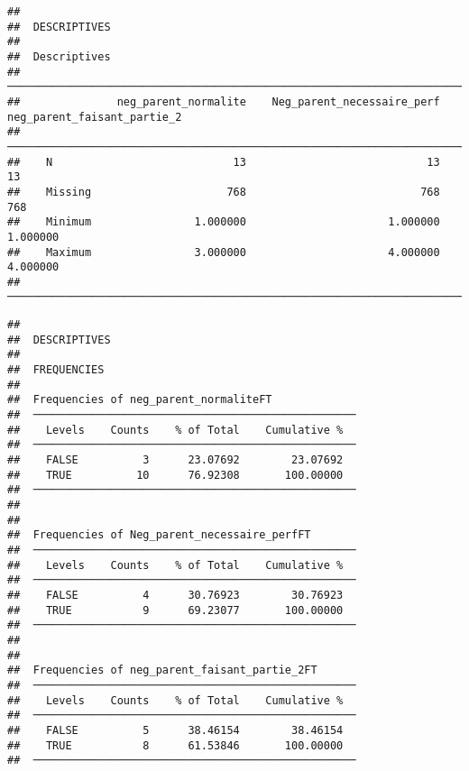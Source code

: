 \documentclass[
]{article}
\begin{document}
\begin{verbatim}
## 
##  DESCRIPTIVES
## 
##  Descriptives                                                                                     
##  ──────────────────────────────────────────────────────────────────────────────────────────────── 
##               neg_parent_normalite    Neg_parent_necessaire_perf    neg_parent_faisant_partie_2   
##  ──────────────────────────────────────────────────────────────────────────────────────────────── 
##    N                            13                            13                             13   
##    Missing                     768                           768                            768   
##    Minimum                1.000000                      1.000000                       1.000000   
##    Maximum                3.000000                      4.000000                       4.000000   
##  ────────────────────────────────────────────────────────────────────────────────────────────────
\end{verbatim}

\begin{verbatim}
## 
##  DESCRIPTIVES
## 
##  FREQUENCIES
## 
##  Frequencies of neg_parent_normaliteFT              
##  ────────────────────────────────────────────────── 
##    Levels    Counts    % of Total    Cumulative %   
##  ────────────────────────────────────────────────── 
##    FALSE          3      23.07692        23.07692   
##    TRUE          10      76.92308       100.00000   
##  ────────────────────────────────────────────────── 
## 
## 
##  Frequencies of Neg_parent_necessaire_perfFT        
##  ────────────────────────────────────────────────── 
##    Levels    Counts    % of Total    Cumulative %   
##  ────────────────────────────────────────────────── 
##    FALSE          4      30.76923        30.76923   
##    TRUE           9      69.23077       100.00000   
##  ────────────────────────────────────────────────── 
## 
## 
##  Frequencies of neg_parent_faisant_partie_2FT       
##  ────────────────────────────────────────────────── 
##    Levels    Counts    % of Total    Cumulative %   
##  ────────────────────────────────────────────────── 
##    FALSE          5      38.46154        38.46154   
##    TRUE           8      61.53846       100.00000   
##  ──────────────────────────────────────────────────
\end{verbatim}
\end{document}
